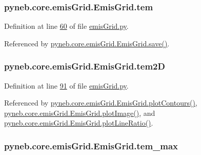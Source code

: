 \hypertarget{classpyneb_1_1core_1_1emis_grid_1_1_emis_grid_ac6e2be63ad3ea6c0d246d1c6d1afc54b}{
\subsubsection[{tem}]{\setlength{\rightskip}{0pt plus 5cm}pyneb.\-core.\-emis\-Grid.\-Emis\-Grid.\-tem}}\label{classpyneb_1_1core_1_1emis_grid_1_1_emis_grid_ac6e2be63ad3ea6c0d246d1c6d1afc54b}


Definition at line \hyperlink{emis_grid_8py_source_l00060}{60} of file \hyperlink{emis_grid_8py_source}{emis\-Grid.\-py}.



Referenced by \hyperlink{emis_grid_8py_source_l00099}{pyneb.\-core.\-emis\-Grid.\-Emis\-Grid.\-save()}.

\hypertarget{classpyneb_1_1core_1_1emis_grid_1_1_emis_grid_ae1904aecb62ca67772b3998cca09fabd}{
\subsubsection[{tem2\-D}]{\setlength{\rightskip}{0pt plus 5cm}pyneb.\-core.\-emis\-Grid.\-Emis\-Grid.\-tem2\-D}}\label{classpyneb_1_1core_1_1emis_grid_1_1_emis_grid_ae1904aecb62ca67772b3998cca09fabd}


Definition at line \hyperlink{emis_grid_8py_source_l00091}{91} of file \hyperlink{emis_grid_8py_source}{emis\-Grid.\-py}.



Referenced by \hyperlink{emis_grid_8py_source_l00182}{pyneb.\-core.\-emis\-Grid.\-Emis\-Grid.\-plot\-Contours()}, \hyperlink{emis_grid_8py_source_l00140}{pyneb.\-core.\-emis\-Grid.\-Emis\-Grid.\-plot\-Image()}, and \hyperlink{emis_grid_8py_source_l00241}{pyneb.\-core.\-emis\-Grid.\-Emis\-Grid.\-plot\-Line\-Ratio()}.

\hypertarget{classpyneb_1_1core_1_1emis_grid_1_1_emis_grid_a2d0eacad9eb4fa87ef08d1f710cf2317}{
\subsubsection[{tem\-\_\-max}]{\setlength{\rightskip}{0pt plus 5cm}pyneb.\-core.\-emis\-Grid.\-Emis\-Grid.\-tem\-\_\-max}}\label{classpyneb_1_1core_1_1emis_grid_1_1_emis_grid_a2d0eacad9eb4fa87ef08d1f710cf2317}


